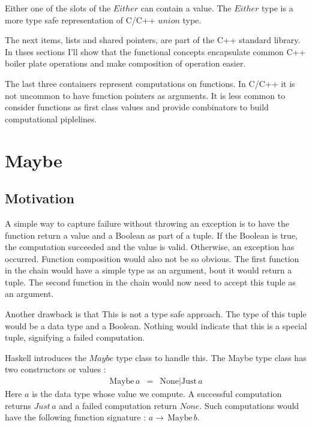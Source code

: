 \documentclass[12pt,fleqn]{article}
\begin{document}
Either one of the slots of the $Either$ can contain a value. The $Either$ type is a more type safe representation of C/C++ $union$ type.

The next items, lists and shared pointers, are part of the C++ standard library.
In thses sections I'll show that the functional concepts encapsulate common C++ boiler plate operations and make composition of operation easier.

The last three containers represent computations on functions.
In C/C++ it is not uncommon to have function pointers as arguments.
It is less common to consider functions as first class values and provide combinators to build computational piplelines.


%
%
\section{Maybe}
%

%
\subsection{Motivation}
%
%

A simple way to capture failure without throwing an exception is to have the function return a value and a Boolean as part of a tuple.
If the Boolean is true, the computation succeeded and the value is valid. Otherwise, an exception has occurred.
Function composition would also not be so obvious. The first function in the chain would have a simple type as an argument, bout it would return a tuple.
The second function in the chain would now need to accept this tuple as an argument.

Another drawback is that This is not a type safe approach.
The type of this tuple would be a data type and a Boolean. Nothing would indicate that this is a special tuple, signifying a failed computation.

Haskell introduces the $Maybe$ type class to handle this.
The Maybe type class has two constructors or values :
%
\begin{eqnarray*}
\mbox{Maybe}\, a &=& \mbox{None} | \mbox{Just} \, a
\end{eqnarray*}
%
Here $a$ is the data type whose value we compute.
A successful computation returns $Just \, a$ and a failed computation return $None$.
Such computations would have the following function signature : $ a \rightarrow \, \mbox{Maybe}\, b$.
\end{document}
